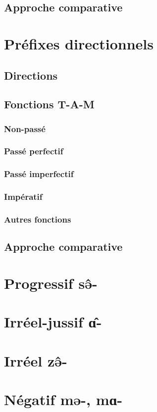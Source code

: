 \documentclass[11pt, a4paper]{book}              %
\newcommand{\ipa}[1]{{\phon \mbox{#1}}} %
\begin{document}
\subsection{Approche comparative}

\section{Préfixes directionnels}
\subsection{Directions}
\subsection{Fonctions T-A-M}
\subsubsection{Non-passé}
\subsubsection{Passé perfectif}
\subsubsection{Passé imperfectif}
\subsubsection{Impératif}
\subsubsection{Autres fonctions}
\subsection{Approche comparative}

\section{Progressif \ipa{sə̂-}}
\section{Irréel-jussif \ipa{ɑ̂-}}
\section{Irréel \ipa{zə̂-}}
\section{Négatif \ipa{mə-}, \ipa{mɑ-}}
\end{document}
